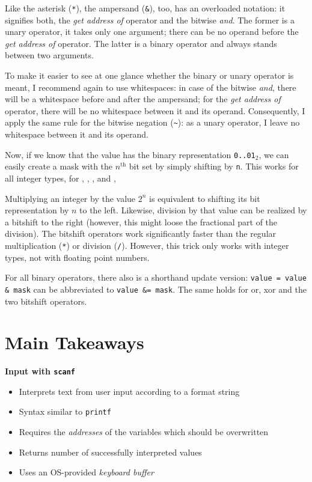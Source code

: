 {\begin{hintbox}
Like the asterisk (\texttt{*}), the ampersand (\texttt{\&}), too, has an overloaded notation: it signifies both, the \emph{get address of} operator and the bitwise \emph{and}. The former is a unary operator, \ie it takes only one argument; there can be no operand before the \emph{get address of} operator. The latter is a binary operator and always stands between two arguments.

To make it easier to see at one glance whether the binary or unary operator is meant, I recommend again to use whitespaces: in case of the bitwise \emph{and}, there will be a whitespace before and after the ampersand; for the \emph{get address of} operator, there will be no whitespace between it and its operand. Consequently, I apply the same rule for the bitwise negation (\texttt{\textasciitilde}): as a unary operator, I leave no whitespace between it and its operand.
\end{hintbox}

Now, if we know that the value  has the binary representation \texttt{0..01$_2$}, we can easily create a mask with the $n^{\text{th}}$ bit set by simply shifting  by \texttt{n}. This works for all integer types, \ie for , , ,  and , 

\begin{hintbox}
Multiplying an integer by the value $2^n$ is equivalent to shifting its bit representation by $n$ to the left. Likewise, division by that value can be realized by a bitshift to the right (however, this might loose the fractional part of the division). The bitshift operators work significantly faster than the regular multiplication (\texttt{*}) or division (\texttt{/}). However, this trick only works with integer types, not with floating point numbers.
\end{hintbox}

For all binary operators, there also is a shorthand update version: \texttt{value = value \& mask} can be abbreviated to \texttt{value \&= mask}. The same holds for or, xor and the two bitshift operators.

\section{Main Takeaways}
\begin{defbox}
\textbf{Input with \texttt{scanf}}
\begin{itemize}
\item Interprets text from user input according to a format string
\item Syntax similar to \texttt{printf}
\item Requires the \emph{addresses} of the variables which should be overwritten
\item Returns number of successfully interpreted values
\item Uses an OS-provided \emph{keyboard buffer}
\end{itemize}


\end{defbox}}
